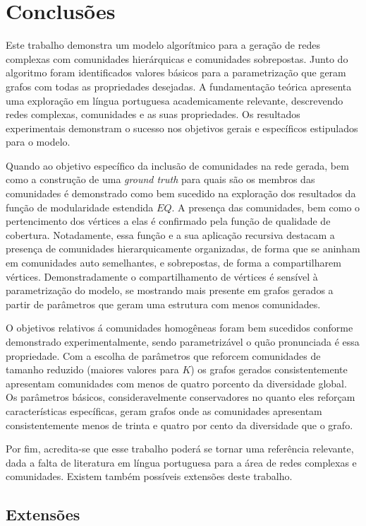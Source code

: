 \documentclass[notes.tex]{subfiles}
\begin{document}
\chapter{Conclusões}

Este trabalho demonstra um modelo algorítmico para a geração de redes complexas com comunidades hierárquicas e comunidades sobrepostas.
Junto do algoritmo foram identificados valores básicos para a parametrização que geram grafos com todas as propriedades desejadas.
A fundamentação teórica apresenta uma exploração em língua portuguesa academicamente relevante, descrevendo redes complexas, comunidades e as suas propriedades.
Os resultados experimentais demonstram o sucesso nos objetivos gerais e específicos estipulados para o modelo.

Quando ao objetivo específico da inclusão de comunidades na rede gerada, bem como a construção de uma \emph{ground truth} para quais são os membros das comunidades é demonstrado como bem sucedido na exploração dos resultados da função de modularidade estendida $EQ$.
A presença das comunidades, bem como o pertencimento dos vértices a elas é confirmado pela função de qualidade de cobertura.
Notadamente, essa função e a sua aplicação recursiva destacam a presença de comunidades hierarquicamente organizadas, de forma que se aninham em comunidades auto semelhantes, e sobrepostas, de forma a compartilharem vértices.
Demonstradamente o compartilhamento de vértices é sensível à parametrização do modelo, se mostrando mais presente em grafos gerados a partir de parâmetros que geram uma estrutura com menos comunidades.

O objetivos relativos á comunidades homogêneas foram bem sucedidos conforme demonstrado experimentalmente, sendo parametrizável o quão pronunciada é essa propriedade.
Com a escolha de parâmetros que reforcem comunidades de tamanho reduzido (maiores valores para $K$) os grafos gerados consistentemente apresentam comunidades com menos de quatro porcento da diversidade global.
Os parâmetros básicos, consideravelmente conservadores no quanto eles reforçam características específicas, geram grafos onde as comunidades apresentam consistentemente menos de trinta e quatro por cento da diversidade que o grafo.

Por fim, acredita-se que esse trabalho poderá se tornar uma referência relevante, dada a falta de literatura em língua portuguesa para a área de redes complexas e comunidades.
Existem também possíveis extensões deste trabalho.

\section{Extensões}
\end{document}
